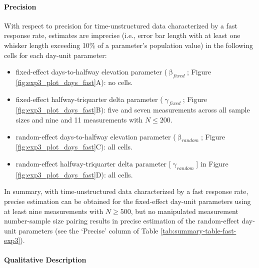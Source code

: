 \documentclass[
12pt, %
twoside,
english]{guelphthesis}
\theoremstyle{definition}
\theoremstyle{definition}
\theoremstyle{definition}
\theoremstyle{definition}
\theoremstyle{remark}
\begin{document}
\hypertarget{precision-fast-exp3}{%
\paragraph{Precision}\label{precision-fast-exp3}}

With respect to precision for time-unstructured data characterized by a fast response rate, estimates are imprecise (i.e., error bar length with at least one whisker length exceeding 10\% of a parameter's population value) in the following cells for each day-unit parameter:
\begin{itemize}
\tightlist
\item
  fixed-effect days-to-halfway elevation parameter (\(\upbeta_{fixed}\); Figure \ref{fig:exp3_plot_days_fast}A): no cells.
\item
  fixed-effect halfway-triquarter delta parameter (\(\upgamma_{fixed}\); Figure \ref{fig:exp3_plot_days_fast}B): five and seven measurements across all sample sizes and nine and 11 measurements with \(N \le 200\).
\item
  random-effect days-to-halfway elevation parameter (\(\upbeta_{random}\); Figure \ref{fig:exp3_plot_days_fast}C): all cells.
\item
  random-effect halfway-triquarter delta parameter {[}\(\upgamma_{random}\){]} in Figure \ref{fig:exp3_plot_days_fast}D): all cells.
\end{itemize}
In summary, with time-unstructured data characterized by a fast response rate, precise estimation can be obtained for the fixed-effect day-unit parameters using at least nine measurements with \(N \ge 500\), but no manipulated measurement number-sample size pairing results in precise estimation of the random-effect day-unit parameters (see the `Precise' column of Table \ref{tab:summary-table-fast-exp3}).

\hypertarget{qualitative-fast-exp3}{%
\paragraph{Qualitative Description}\label{qualitative-fast-exp3}}
\end{document}
